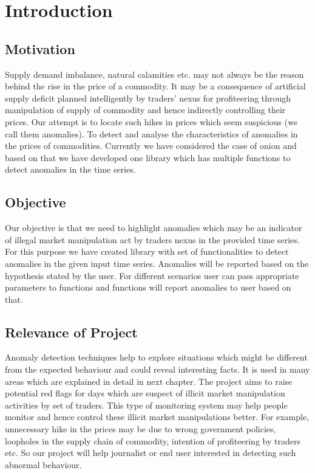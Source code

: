 \chapter{Introduction}


\section{Motivation}

Supply demand imbalance, natural calamities etc. may not always be the reason behind the rise in the price of a commodity. ​It may be a consequence of artificial supply deficit planned intelligently by traders’ nexus for profiteering through manipulation of supply of commodity and hence indirectly controlling their prices. ​Our attempt is to locate such hikes in prices which seem suspicious (we call them anomalies).​ To detect and analyse the characteristics of anomalies in the prices of commodities. Currently we have considered the case of onion and based on that we have developed one library which has multiple functions to detect anomalies in the time series.


\section{Objective}

Our objective is that we need to highlight anomalies which may be an indicator of illegal market manipulation act by traders nexus in the provided time series. For this purpose we have created library with set of functionalities to detect anomalies in the given input time series. Anomalies will be reported based on the hypothesis stated by the user. For different scenarios user can pass appropriate parameters to functions and functions will report anomalies to user based on that.


\section{Relevance of Project}

Anomaly detection techniques help to explore situations which might be different from the expected behaviour and could reveal interesting facts. It is used in many areas which are explained in detail in next chapter. The project aims to raise potential red flags for days which are suspect of illicit market manipulation activities by set of traders. This type of monitoring system may help people monitor and hence control these illicit market manipulations better.
For example, unnecessary hike in the prices may be due to wrong government policies, loopholes in the supply chain of commodity, intention of profiteering by traders etc. So our project will help journalist or end user interested in detecting such abnormal behaviour.
